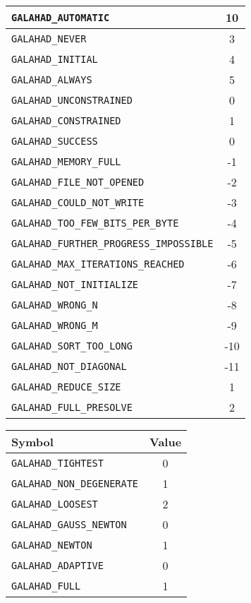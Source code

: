 \documentclass{galahad}
\begin{document}
\begin{figure}[htbf]
\begin{center}
\begin{tabular}{|l|c|}
{\tt GALAHAD\_AUTOMATIC}            & 10 \\
\hline
{\tt GALAHAD\_NEVER}                &  3 \\
{\tt GALAHAD\_INITIAL}              &  4 \\
{\tt GALAHAD\_ALWAYS}               &  5 \\
\hline
{\tt GALAHAD\_UNCONSTRAINED}        &  0 \\
{\tt GALAHAD\_CONSTRAINED}          &  1 \\
\hline
{\tt GALAHAD\_SUCCESS}              &  0 \\
{\tt GALAHAD\_MEMORY\_FULL}         & -1 \\
{\tt GALAHAD\_FILE\_NOT\_OPENED}    & -2 \\
{\tt GALAHAD\_COULD\_NOT\_WRITE}    & -3 \\
{\tt GALAHAD\_TOO\_FEW\_BITS\_PER\_BYTE} &  -4 \\
{\tt GALAHAD\_FURTHER\_PROGRESS\_IMPOSSIBLE} & -5 \\
{\tt GALAHAD\_MAX\_ITERATIONS\_REACHED} & -6 \\
{\tt GALAHAD\_NOT\_INITIALIZE}      & -7 \\
{\tt GALAHAD\_WRONG\_N}             & -8 \\
{\tt GALAHAD\_WRONG\_M}             & -9 \\
{\tt GALAHAD\_SORT\_TOO\_LONG}      & -10 \\
{\tt GALAHAD\_NOT\_DIAGONAL}        & -11 \\
\hline
{\tt GALAHAD\_REDUCE\_SIZE}         &  1 \\
{\tt GALAHAD\_FULL\_PRESOLVE}       &  2 \\
\hline
\end{tabular}
\hspace*{1cm}
\begin{tabular}{|l|c|}
\hline
Symbol                              & Value \\
\hline
{\tt GALAHAD\_TIGHTEST}             &  0 \\
{\tt GALAHAD\_NON\_DEGENERATE}      &  1 \\
{\tt GALAHAD\_LOOSEST}              &  2 \\
\hline
{\tt GALAHAD\_GAUSS\_NEWTON}        &  0 \\
{\tt GALAHAD\_NEWTON}               &  1 \\
\hline
{\tt GALAHAD\_ADAPTIVE}             &  0 \\
{\tt GALAHAD\_FULL}                 &  1 \\

\end{tabular}
\end{center}
\end{figure}
\end{document}
